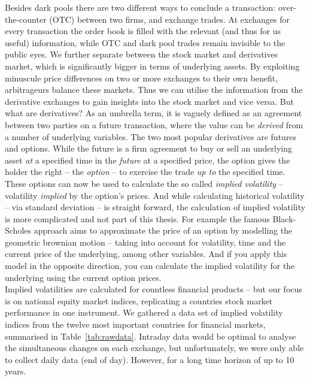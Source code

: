 \documentclass[twoside,twocolumn]{article}
\begin{document}
Besides dark pools there are two different ways to conclude a transaction: over-the-counter (OTC) between two firms, and exchange trades. At exchanges for every transaction the order book is filled with the relevant (and thus for us useful) information, while OTC and dark pool trades remain invisible to the public eyes. We further separate between the stock market and derivatives market, which is significantly bigger in terms of underlying assets. By exploiting minuscule price differences on two or more exchanges to their own benefit, arbitrageurs balance these markets. Thus we can utilise the information from the derivative exchanges to gain insights into the stock market and vice versa. But what are derivatives? As an umbrella term, it is vaguely defined as an agreement between two parties on a future transaction, where the value can be \textit{derived} from a number of underlying variables. The two most popular derivatives are futures and options. While the future is a firm agreement to buy or sell an underlying asset \textit{at} a specified time in the \textit{future} at a specified price, the option gives the holder the right -- the \textit{option} -- to exercise the trade \textit{up to} the specified time. These options can now be used to calculate the so called \textit{implied volatility} -- volatility \textit{implied} by the option's prices.
And while calculating historical volatility -- via standard deviation -- is straight forward, the calculation of implied volatility is more complicated and not part of this thesis. For example the famous Black-Scholes approach aims to approximate the price of an option by modelling the geometric brownian motion -- taking into account for volatility, time and the current price of the underlying, among other variables. And if you apply this model in the opposite direction, you can calculate the implied volatility for the underlying using the current option prices. \cite{Joshi2008}  \cite{Hull2021} \\
Implied volatilities are calculated for countless financial products -- but our focus is on national equity market indices, replicating a countries stock market performance in one instrument. We gathered a data set of implied volatility indices from the twelve most important countries for financial markets, summarised in Table~\ref{tab:rawdata}.  Intraday data would be optimal to analyse the simultaneous changes on each exchange, but unfortunately, we were only able to collect daily data (end of day). However, for a long time horizon of up to 10 years.   \cite{Hull2021}
\end{document}
